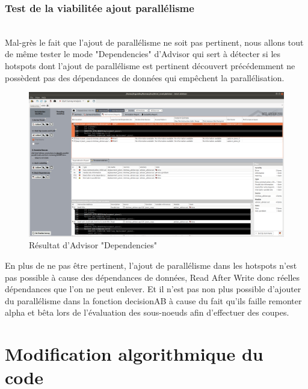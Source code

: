 \documentclass[
 aip,
 jmp,
 amsmath,amssymb,
 reprint
]{revtex4-1}
\begin{document}
\subsubsection{Test de la viabilitée ajout parallélisme}\mbox{}\\

Mal-grès le fait que l'ajout de parallélisme ne soit pas pertinent, nous allons tout de même tester le mode "Dependencies" d'Advisor qui sert à détecter si les hotspots dont l'ajout de parallélisme est pertinent découvert précédemment ne possèdent pas des dépendances de données qui empêchent la parallélisation.\\

\begin{figure}[H]
  \includegraphics[width=\linewidth, keepaspectratio=true]{dependecies.png}
  \caption{Résultat d'Advisor "Dependencies"\label{Fig:advisor_dependencies}}
\end{figure}

En plus de ne pas être pertinent, l'ajout de parallélisme dans les hotspots n'est pas possible à cause des dépendances de données, Read After Write donc réelles dépendances que l'on ne peut enlever. Et il n'est pas non plus possible d'ajouter du parallélisme dans la fonction decisionAB à cause du fait qu'ils faille remonter alpha et bêta lors de l'évaluation des sous-noeuds afin d'effectuer des coupes.\\ 

\section{Modification algorithmique du code}
\end{document}
